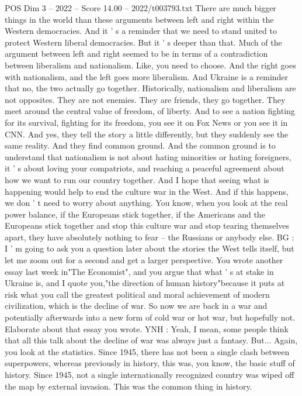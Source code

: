 \begin{textsample}{POS Dim 3 – 2022 – Score 14.00 – 2022/t003793.txt}
There are much bigger things in the world than these arguments between left and right within the Western democracies.
And it ' s a reminder that we need to stand united to protect Western liberal democracies.
But it ' s deeper than that.
Much of the argument between left and right seemed to be in terms of a contradiction between liberalism and nationalism.
Like, you need to choose.
And the right goes with nationalism, and the left goes more liberalism.
And Ukraine is a reminder that no, the two actually go together.
Historically, nationalism and liberalism are not opposites.
They are not enemies.
They are friends, they go together.
They meet around the central value of freedom, of liberty.
And to see a nation fighting for its survival, fighting for its freedom, you see it on Fox News or you see it in CNN.
And yes, they tell the story a little differently, but they suddenly see the same reality.
And they find common ground.
And the common ground is to understand that nationalism is not about hating minorities or hating foreigners, it ' s about loving your compatriots, and reaching a peaceful agreement about how we want to run our country together.
And I hope that seeing what is happening would help to end the culture war in the West.
And if this happens, we don ' t need to worry about anything.
You know, when you look at the real power balance, if the Europeans stick together, if the Americans and the Europeans stick together and stop this culture war and stop tearing themselves apart, they have absolutely nothing to fear -- the Russians or anybody else.
BG : I ' m going to ask you a question later about the stories the West tells itself, but let me zoom out for a second and get a larger perspective.
You wrote another essay last week in"The Economist", and you argue that what ' s at stake in Ukraine is, and I quote you,"the direction of human history"because it puts at risk what you call the greatest political and moral achievement of modern civilization, which is the decline of war.
So now we are back in a war and potentially afterwards into a new form of cold war or hot war, but hopefully not.
Elaborate about that essay you wrote.
YNH : Yeah, I mean, some people think that all this talk about the decline of war was always just a fantasy.
But...
Again, you look at the statistics.
Since 1945, there has not been a single clash between superpowers, whereas previously in history, this was, you know, the basic stuff of history.
Since 1945, not a single internationally recognized country was wiped off the map by external invasion.
This was the common thing in history.

\end{textsample}
